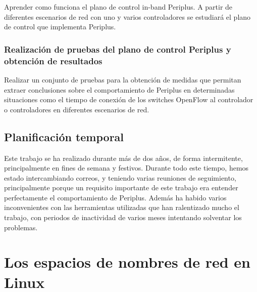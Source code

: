 \documentclass[a4paper, 12pt]{book}
\begin{document}
	Aprender como funciona el plano de control in-band Periplus. A partir de diferentes escenarios de red con uno y varios controladores se estudiará
	el plano de control que implementa Periplus.
	
	\subsection{Realización de pruebas del plano de control Periplus y obtención de resultados}
	\label{sec:objetivos-analisis-periplus}
	
	Realizar un conjunto de pruebas para la obtención de medidas que permitan extraer conclusiones
	sobre el comportamiento de Periplus	en determinadas	situaciones como el tiempo de conexión de los switches OpenFlow al controlador o controladores en diferentes escenarios de red.
	
	
	\section{Planificación temporal}
	\label{sec:planificacion-temporal}
	
	Este trabajo se ha realizado durante más de dos años, de forma intermitente, principalmente en fines de semana y festivos. Durante todo este tiempo, hemos estado intercambiando correos, y teniendo varias reuniones de seguimiento, principalmente porque un requisito importante de este trabajo era entender perfectamente el comportamiento de Periplus.
	Además ha habido varios inconvenientes con las herramientas utilizadas que han ralentizado mucho el trabajo, con periodos de inactividad de varios meses intentando solventar los problemas.
	
	
	
	\cleardoublepage
		
	
	\cleardoublepage %
	\chapter{Los espacios de nombres de red en Linux  } %
	\label{chap:mininet} %
	
\end{document}
